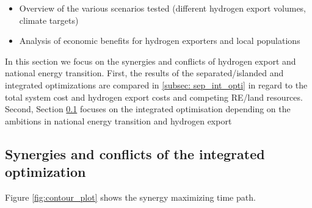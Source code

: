 \begin{itemize}
    \item Overview of the various scenarios tested (different hydrogen export volumes, climate targets)
    \item Analysis of economic benefits for hydrogen exporters and local populations
\end{itemize}

In this section we focus on the synergies and conflicts
of hydrogen export and national energy transition.
First, the results of the separated/islanded and integrated optimizations
are compared in \ref{subsec: sep_int_opti} in regard to the total system cost and
hydrogen export costs and competing RE/land resources.
Second, Section \ref{subsec: syn_conf_integrated} focuses on the integrated optimisation 
depending on the ambitions in national energy transition and hydrogen export




\subsection{Synergies and conflicts of the integrated optimization}
\label{subsec: syn_conf_integrated}
Figure \ref{fig:contour_plot} shows the synergy maximizing time path.


